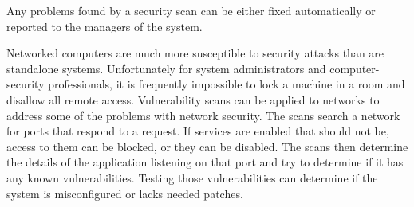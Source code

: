 Any problems found by a security scan can be either fixed automatically or reported to the managers of the system.

Networked computers are much more susceptible to security attacks than are standalone systems.
Unfortunately for system administrators and computer-security professionals, it is frequently impossible to lock a machine in a room and disallow all remote access.
Vulnerability scans can be applied to networks to address some of the problems with network security.
The scans search a network for ports that respond to a request.
If services are enabled that should not be, access to them can be blocked, or they can be disabled.
The scans then determine the details of the application listening on that port and try to determine if it has any known vulnerabilities.
Testing those vulnerabilities can determine if the system is misconfigured or lacks needed patches.


